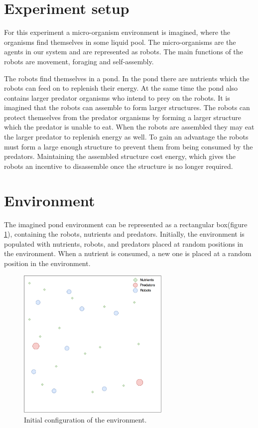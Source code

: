 \section{Experiment setup}
\label{sec:description}
For this experiment a micro-organism environment is imagined, where the organisms find themselves in some liquid pool. 
The micro-organisms are the agents in our system and are represented as robots.
The main functions of the robots are movement, foraging and self-assembly.

The robots find themselves in a pond.
In the pond there are nutrients which the robots can feed on to replenish their energy.
At the same time the pond also contains larger predator organisms who intend to prey on the robots.
It is imagined that the robots can assemble to form larger structures.
The robots can protect themselves from the predator organisms by forming a larger structure which the predator is unable to eat.
When the robots are assembled they may eat the larger predator to replenish energy as well.
To gain an advantage the robots must form a large enough structure to prevent them from being consumed by the predators.
Maintaining the assembled structure cost energy, which gives the robots an incentive to disassemble once the structure is no longer required.

\section{Environment}
The imagined pond environment can be represented as a rectangular box(figure \ref{fig:environment}), containing the robots, nutrients and predators.
Initially, the environment is populated with nutrients, robots, and predators placed at random positions in the environment.
When a nutrient is consumed, a new one is placed at a random position in the environment.

\begin{figure}[H]
	
	\centering
	\includegraphics[width=0.65\textwidth]{chapters/res/Environment.png}
	\caption{Initial configuration of the environment.}
	\label{fig:environment}
\end{figure}


